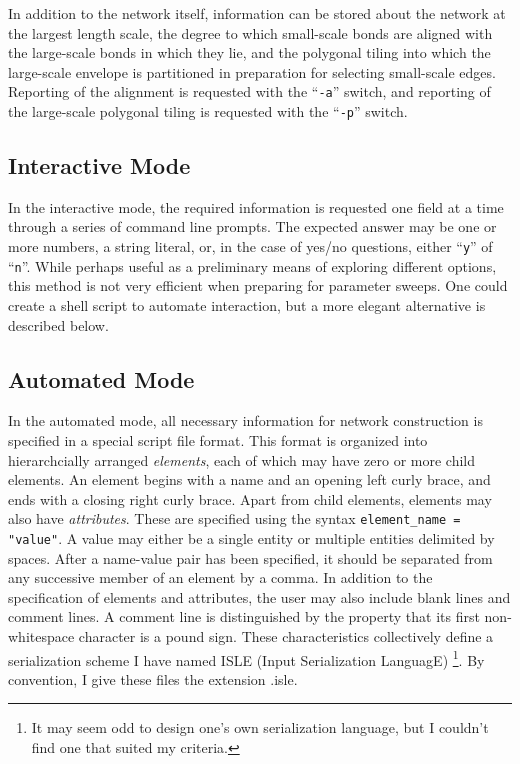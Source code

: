 \documentclass{article}
\begin{document}
In addition to the network itself, information can be stored about the
network at the largest length scale, the degree to which small-scale bonds
are aligned with the large-scale bonds in which they lie, and the polygonal
tiling into which the large-scale envelope is partitioned in preparation for
selecting small-scale edges. Reporting of the alignment is requested with
the ``\texttt{-a}'' switch, and reporting of the large-scale polygonal
tiling is requested with the ``\texttt{-p}'' switch.

\subsection{Interactive Mode}

In the interactive mode, the required information is requested one field at
a time through a series of command line prompts. The expected answer may be
one or more numbers, a string literal, or, in the case of yes/no questions,
either ``\texttt{y}'' of ``\texttt{n}''. While perhaps useful as a preliminary
means of exploring different options, this method is not very efficient when
preparing for parameter sweeps. One could create a shell script to automate
interaction, but a more elegant alternative is described below.

\subsection{Automated Mode}

In the automated mode, all necessary information for network construction
is specified in a special script file format. This format is organized into
hierarchcially arranged \emph{elements}, each of which may have zero or more
child elements. An element begins with a name and an opening left curly brace,
and ends with a closing right curly brace. Apart from child elements, elements
may also have \emph{attributes}. These are specified using the syntax
\texttt{element\_name = "value"}. A value may either be a single entity or
multiple entities delimited by spaces. After a name-value pair has been 
specified, it should be separated from any successive member of an element by a
comma. In addition to the specification of elements and attributes, the user may
also include blank lines and comment lines. A comment line is distinguished by
the property that its first non-whitespace character is a pound sign. These
characteristics collectively define a serialization scheme I have named
ISLE (Input Serialization LanguagE) \footnote{It may seem odd to design one's
own serialization language, but I couldn't find one that suited my criteria.}.
By convention, I give these files the extension .isle.
\end{document}
